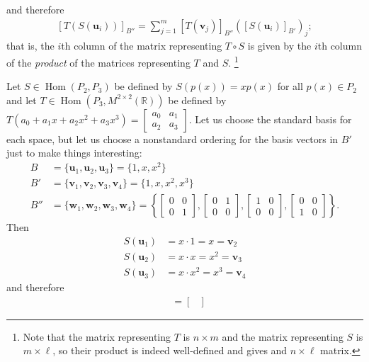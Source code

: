 \documentclass[12pt,letterpaper,reqno]{article}
\numberwithin{equation}{section}
\newcommand{\R}{\ensuremath{\mathbb R}}
\newcommand{\bv}{\mathbf{v}}
\newcommand{\bw}{\mathbf{w}}
\newcommand{\bu}{\mathbf{u}}
\DeclareMathOperator{\Hom}{Hom}
\begin{document}
and therefore
\begin{align}\label{eq:matrix_mult_again}
	[T(S(\bu_i))]_{B''}=\sum_{j=1}^m[T(\bv_j)]_{B''}([S(\bu_i)]_{B'})_j;
\end{align}
that is, the $i$th column of the matrix representing $T \circ S$ is given by the $i$th column of the \emph{product} of the matrices representing $T$ and $S$. \footnote{Note that the matrix representing $T$ is $n \times m$ and the matrix representing $S$ is $m \times \ell$, so their product is indeed well-defined and gives and $n \times \ell$ matrix.}

\begin{example}
Let $S \in \Hom(P_2,P_3)$ be defined by $S(p(x))=xp(x)$ for all $p(x) \in P_2$ and let $T\in \Hom(P_3,M^{2 \times 2}(\R))$ be defined by $T(a_0+a_1x+a_2x^2+a_3x^3)=\begin{bmatrix}
	a_0 & a_1 \\
	a_2 & a_3
\end{bmatrix}$. Let us choose the standard basis for each space, but let us choose a nonstandard ordering for the basis vectors in $B'$ just to make things interesting: 
\begin{align*}
	B&=\{\bu_1,\bu_2,\bu_3\}=\{1,x,x^2\} \\
	B'&=\{\bv_1,\bv_2,\bv_3,\bv_4\}=\{1,x,x^2,x^3\} \\
	B''&=\{\bw_1,\bw_2,\bw_3,\bw_4\}=\left\{
	\begin{bmatrix}
		0 & 0 \\ 
		0 & 1
	\end{bmatrix}, \begin{bmatrix}
		0 & 1 \\ 
		0 & 0
	\end{bmatrix}, \begin{bmatrix}
		1 & 0 \\ 
		0 & 0
	\end{bmatrix}, \begin{bmatrix}
		0 & 0 \\ 
		1 & 0
	\end{bmatrix}
	\right\}.
\end{align*}
Then
\begin{align*}
	S(\bu_1)&=x\cdot 1=x=\bv_2 \\
	S(\bu_2)&=x\cdot x=x^2=\bv_3 \\
	S(\bu_3)&=x\cdot x^2=x^3=\bv_4
\end{align*}
and therefore 
\begin{align*}
	[S(\bu_1)]&=\begin{bmatrix}

\end{bmatrix}
\end{align*}
\end{example}
\end{document}
